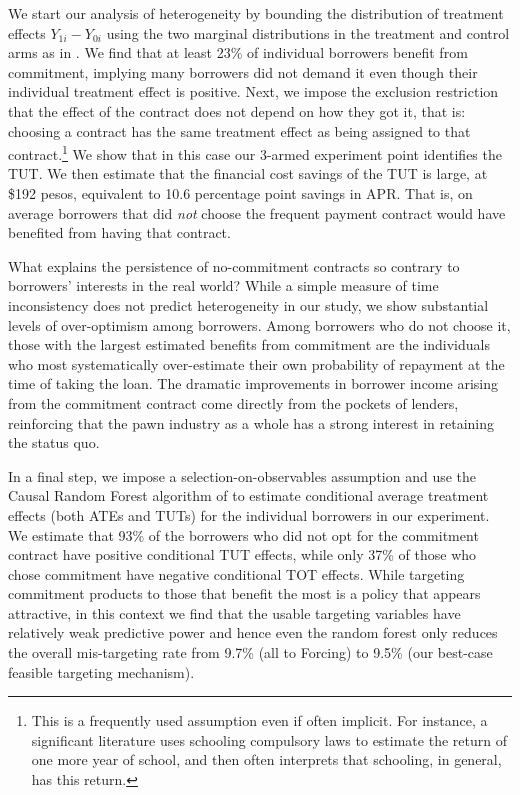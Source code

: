 \documentclass[oneside,11pt]{article}
\begin{document}
We start our analysis of heterogeneity by bounding the distribution of treatment effects $Y_{1i}-Y_{0i}$ using the two marginal distributions in the treatment and control arms as in \cite{fan2010sharp}. We find that at least 23\% of individual borrowers benefit from commitment, implying many borrowers did not demand it even though their individual treatment effect is positive. Next, we impose the exclusion restriction that the effect of the contract does not depend on how they got it, that is: choosing a contract has the same treatment effect as being assigned to that contract.\footnote{This is a frequently used assumption even if often implicit. For instance, a significant literature uses schooling compulsory laws to estimate the return of one more year of school, and then often interprets that schooling, in general, has this return.} We show that in this case our 3-armed experiment point identifies the TUT. We then estimate that the financial cost savings of the TUT is large, at \$192 pesos, equivalent to 10.6 percentage point savings in APR. That is, on average borrowers that did \textit{not} choose the frequent payment contract would have benefited from having that contract.%

What explains the persistence of no-commitment contracts so contrary to borrowers’ interests in the real world?  While a simple measure of time inconsistency does not predict heterogeneity in our study, we show substantial levels of over-optimism among borrowers. Among borrowers who do not choose it, those with the largest estimated benefits from commitment are the individuals who most systematically over-estimate their own probability of repayment at the time of taking the loan. The dramatic improvements in borrower income arising from the commitment contract come directly from the pockets of lenders, reinforcing that the pawn industry as a whole has a strong interest in retaining the status quo.

In a final step, we impose a selection-on-observables assumption and use the Causal Random Forest algorithm of \cite{atheygrf} to estimate conditional average treatment effects (both ATEs and TUTs) for the individual borrowers in our experiment.  We estimate that 93\% of the borrowers who did not opt for the commitment contract have positive conditional TUT effects, while only 37\% of those who chose commitment have negative conditional TOT effects.   While targeting commitment products to those that benefit the most is a policy that appears attractive, in this context we find that the usable targeting variables have relatively weak predictive power and hence even the random forest only reduces the overall mis-targeting rate from 9.7\% (all to Forcing) to 9.5\% (our best-case feasible targeting mechanism).  
\end{document}
